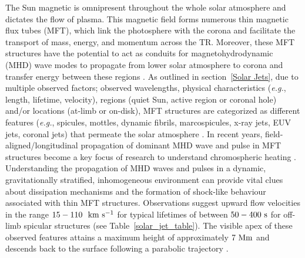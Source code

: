 \documentclass[12pt]{ociamthesis}
\newcommand{\kms}{~\rm{km ~s^{-1}}}
\newcommand{\np}{\\ \\}
\begin{document}
The Sun magnetic is omnipresent throughout the whole solar atmosphere and dictates the flow of plasma. This magnetic field forms numerous thin magnetic flux tubes (MFT), which link the photosphere with the corona and facilitate the transport of mass, energy, and momentum across the TR. Moreover, these MFT structures have the potential to act as conduits for magnetohydrodynamic (MHD) wave modes to propagate from lower solar atmosphere to corona and transfer energy between these regions \citep{Pontieu2004Natur, Kukhianidze2006AA449L35K, Zaqarashvili2007AA474627Z, He2009AA497525H}. As outlined in section~\ref{Solar Jets}, due to multiple observed factors; observed wavelengths, physical characteristics (\textit{e.g.}, length, lifetime, velocity), regions (quiet Sun, active region or coronal hole) and/or locations (at-limb or on-disk), MFT structures are categorized as different features (\textit{e.g.}, spicules, mottles, dynamic fibrils, marcospicules, x-ray jets, EUV jets, coronal jets) that permeate the solar atmosphere \citep[see reviews by:][]{Beckers1968, Beckers1972ARA&A, Tsiropoula2012}.  In recent years, field-aligned/longitudinal propagation of dominant MHD wave and pulse in MFT structures become a key focus of research to understand chromospheric heating \citep{Narain1990, Zaqarashvili_2009SSRv, Jess2015}. Understanding the propagation of MHD waves and pulses in a dynamic, gravitationally stratified, inhomogeneous environment can provide vital clues about dissipation mechanisms and the formation of shock-like behaviour associated with thin MFT structures. Observations suggest upward flow velocities in the range $15-110 ~\kms$ for typical lifetimes of between $50-400~\rm{s}$ for off-limb spicular structures (see Table~\ref{solar_jet_table}). The visible apex of these observed features attains a maximum height of approximately $7~\rm{Mm}$ and descends back to the surface following a parabolic trajectory \citep{Pereira2012,Pereira2016ApJ82465P}. \np
%
\end{document}
